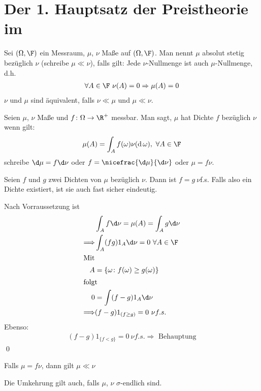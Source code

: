 	\section{Der 1. Hauptsatz der Preistheorie im \epm}
	\begin{defi}
		Sei $(\Omega,\F)$ ein Messraum, $\mu$, $\nu$ Maße auf $(\Omega,\F)$. Man nennt $\mu$ absolut stetig bezüglich $\nu$ (schreibe $\mu\ll\nu$), falls gilt: Jede $\nu$-Nullmenge ist auch $\mu$-Nullmenge, d.h.\begin{align*}
			\forall A\in\F\ \nu(A)=0\Rightarrow\mu(A)=0
		\end{align*}
		$\nu$ und $\mu$ sind äquivalent, falls $\nu\ll\mu$ und $\mu\ll\nu$.
	\end{defi}
	\begin{defi}
		Seien $\mu$, $\nu$ Maße und $f\colon\Omega\to\R^+$ messbar. Man sagt, $\mu$ hat Dichte $f$ bezüglich $\nu$ wenn gilt:
		\begin{align*}
			\mu(A)=\int_Af(\omega)\nu(\operatorname{d}\omega),\ \forall A\in\F 
		\end{align*}
		schreibe $\d\mu=f\d\nu$ oder $f=\nicefrac{\d\mu}{\d\nu}$ oder $\mu=f\nu$.
	\end{defi}
	\begin{lem}
		Seien $f$ und $g$ zwei Dichten von $\mu$ bezüglich $\nu$. Dann ist $f=g\ \nu$f.s. Falls also ein Dichte existiert, ist sie auch fast sicher eindeutig.
	\end{lem}
	\begin{bew}
		Nach Vorraussetzung ist 
		\begin{align*}
			&\int_Af\d\nu=\mu(A)=\int_Ag\d \nu\\
			\Longrightarrow&\int_A(fg)1_A\d\nu=0\ \forall A\in\F\\
			\intertext{Mit}
			A&=\{\omega\colon f(\omega)\ge g(\omega)\}\\
			\intertext{folgt}
			0&=\int(f-g)1_A\d\nu\\
			\Longrightarrow&(f-g)1_{(f\ge g)}=0\ \nu f.s.
		\end{align*}
		Ebenso:
		\begin{align*}
			(f-g)1_{\{f<g \}}=0\ \nu f.s. \Longrightarrow \text{ Behauptung}
		\end{align*}
		\qed
	\end{bew}
	\begin{lem}
		Falls $\mu=f\nu$, dann gilt $\mu\ll\nu$
	\end{lem}
	\begin{bemerkung}
		Die Umkehrung gilt auch, falls $\mu$, $\nu$  $\sigma$-endlich sind.
	\end{bemerkung}
